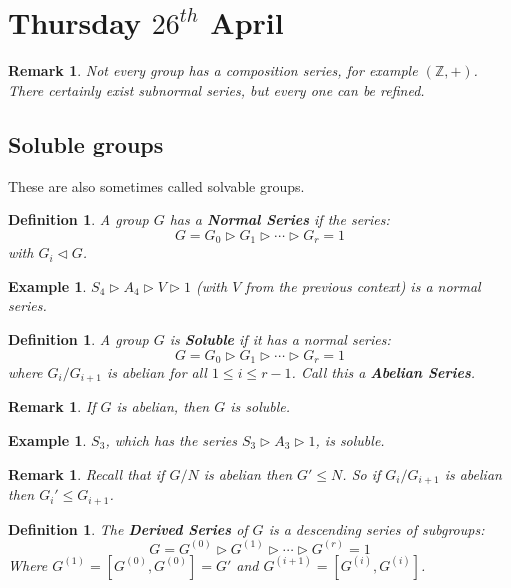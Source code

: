 \documentclass[a4paper,10pt]{article}
\newcommand{\ZZ}{\mathbb{Z}}
\newtheorem{Def}[thm]{Definition}
\newtheorem{eg}[thm]{Example}
\newtheorem{rem}[thm]{Remark}
\begin{document}
\newpage
\section{Thursday $26^{th}$ April}


\begin{rem}
Not every group has a composition series, for example $(\ZZ,+)$. There certainly exist subnormal series, but every one can be refined. 
\end{rem}



\subsection{Soluble groups}
These are also sometimes called solvable groups. 

\begin{Def}
A group $G$ has a \textbf{Normal Series} if the series:
\[ G = G_0 \triangleright G_1 \triangleright \cdots \triangleright G_r = 1 \]
with $G_i \triangleleft G$.
\end{Def}

\begin{eg}
$S_4 \triangleright A_4 \triangleright V \triangleright 1$ (with $V$ from the previous context) is a normal series.
\end{eg}


\begin{Def}
A group $G$ is \textbf{Soluble} if it has a normal series:
\[ G = G_0 \triangleright G_1 \triangleright \cdots \triangleright G_r = 1 \]
where $G_i / G_{i+1}$ is abelian for all $1 \leq i \leq r-1$. Call this a \textbf{Abelian Series}.
\end{Def}

\begin{rem}
If $G$ is abelian, then $G$ is soluble.
\end{rem}

\begin{eg}
$S_3$, which has the series $S_3 \triangleright A_3 \triangleright 1$, is soluble.
\end{eg}

\begin{rem}
Recall that if $G / N$ is abelian then $G' \leq N$. So if $G_i / G_{i+1}$ is abelian then $G_i ' \leq G_{i+1}$.
\end{rem}

\begin{Def}
The \textbf{Derived Series} of $G$ is a descending series of subgroups: 
\[ G = G^{(0)} \triangleright G^{(1)} \triangleright \cdots \triangleright G^{(r)} = 1 \]
Where $G^{(1)} = [G^{(0)}, G^{(0)}] = G'$ and $G^{(i+1)} = [G^{(i)}, G^{(i)}]$. 
\end{Def}
\end{document}
